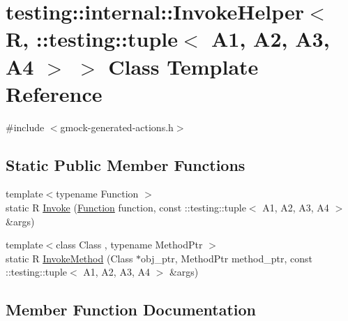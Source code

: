 \hypertarget{classtesting_1_1internal_1_1_invoke_helper_3_01_r_00_01_1_1testing_1_1tuple_3_01_a1_00_01_a2_00_01_a3_00_01_a4_01_4_01_4}{}\section{testing\+:\+:internal\+:\+:Invoke\+Helper$<$ R, \+:\+:testing\+:\+:tuple$<$ A1, A2, A3, A4 $>$ $>$ Class Template Reference}
\label{classtesting_1_1internal_1_1_invoke_helper_3_01_r_00_01_1_1testing_1_1tuple_3_01_a1_00_01_a2_00_01_a3_00_01_a4_01_4_01_4}


{\ttfamily \#include $<$gmock-\/generated-\/actions.\+h$>$}

\subsection*{Static Public Member Functions}
\begin{DoxyCompactItemize}
\item 
{\footnotesize template$<$typename Function $>$ }\\static R \hyperlink{classtesting_1_1internal_1_1_invoke_helper_3_01_r_00_01_1_1testing_1_1tuple_3_01_a1_00_01_a2_00_01_a3_00_01_a4_01_4_01_4_ae7107d300bd2ae7dc8109fb83675eecc}{Invoke} (\hyperlink{structtesting_1_1internal_1_1_function}{Function} function, const \+::testing\+::tuple$<$ A1, A2, A3, A4 $>$ \&args)
\item 
{\footnotesize template$<$class Class , typename Method\+Ptr $>$ }\\static R \hyperlink{classtesting_1_1internal_1_1_invoke_helper_3_01_r_00_01_1_1testing_1_1tuple_3_01_a1_00_01_a2_00_01_a3_00_01_a4_01_4_01_4_ad523e518f7f633bdd9f8a14b7d55708f}{Invoke\+Method} (Class $\ast$obj\+\_\+ptr, Method\+Ptr method\+\_\+ptr, const \+::testing\+::tuple$<$ A1, A2, A3, A4 $>$ \&args)
\end{DoxyCompactItemize}


\subsection{Member Function Documentation}
\mbox{\label{classtesting_1_1internal_1_1_invoke_helper_3_01_r_00_01_1_1testing_1_1tuple_3_01_a1_00_01_a2_00_01_a3_00_01_a4_01_4_01_4_ae7107d300bd2ae7dc8109fb83675eecc}} 
